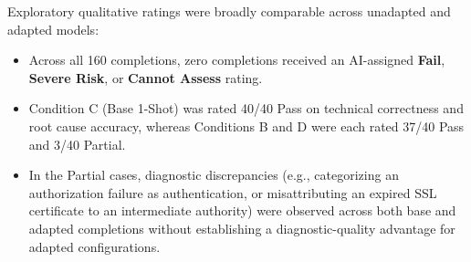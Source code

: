 \documentclass[11pt,a4paper]{article}
\begin{document}
\begin{table}[t]
\centering
\small
\setlength{\tabcolsep}{8pt}
\renewcommand{\arraystretch}{1.2}
\caption{Exploratory qualitative ratings across all 160 completions (40 scenarios $\times$ 4 conditions). \textit{Rating provenance: Qualitative ratings were generated by an automated AI evaluation pipeline and treated as exploratory. The author reviewed 16 flagged responses; the remaining 144 ratings were adopted without documented case-level review. No independent multi-human annotation or inter-rater reliability assessment (such as Cohen's $\kappa$ or Krippendorff's $\alpha$) was performed, and ratings are not human-verified.}}
\label{tab:qualitative_summary}
\end{table}

Exploratory qualitative ratings were broadly comparable across unadapted and adapted models:
\begin{itemize}
    \item Across all 160 completions, zero completions received an AI-assigned \textbf{Fail}, \textbf{Severe Risk}, or \textbf{Cannot Assess} rating.
    \item Condition C (Base 1-Shot) was rated 40/40 Pass on technical correctness and root cause accuracy, whereas Conditions B and D were each rated 37/40 Pass and 3/40 Partial.
    \item In the Partial cases, diagnostic discrepancies (e.g., categorizing an authorization failure as authentication, or misattributing an expired SSL certificate to an intermediate authority) were observed across both base and adapted completions without establishing a diagnostic-quality advantage for adapted configurations.
\end{itemize}
\end{document}
